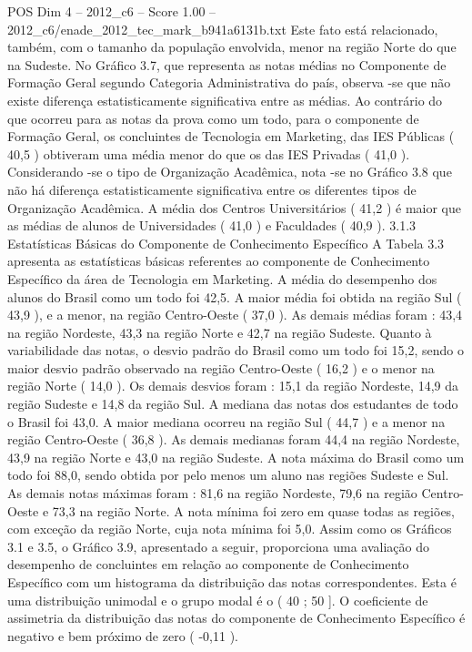 \begin{textsample}{POS Dim 4 – 2012\_c6 – Score 1.00 – 2012\_c6/enade\_2012\_tec\_mark\_b941a6131b.txt}
Este fato está relacionado, também, com o tamanho da população envolvida, menor na região Norte do que na Sudeste.
No Gráfico 3.7, que representa as notas médias no Componente de Formação Geral segundo Categoria Administrativa do país, observa -se que não existe diferença estatisticamente significativa entre as médias.
Ao contrário do que ocorreu para as notas da prova como um todo, para o componente de Formação Geral, os concluintes de Tecnologia em Marketing, das IES Públicas ( 40,5 ) obtiveram uma média menor do que os das IES Privadas ( 41,0 ).
Considerando -se o tipo de Organização Acadêmica, nota -se no Gráfico 3.8 que não há diferença estatisticamente significativa entre os diferentes tipos de Organização Acadêmica.
A média dos Centros Universitários ( 41,2 ) é maior que as médias de alunos de Universidades ( 41,0 ) e Faculdades ( 40,9 ). 3.1.3 Estatísticas Básicas do Componente de Conhecimento Específico A Tabela 3.3 apresenta as estatísticas básicas referentes ao componente de Conhecimento Específico da área de Tecnologia em Marketing.
A média do desempenho dos alunos do Brasil como um todo foi 42,5.
A maior média foi obtida na região Sul ( 43,9 ), e a menor, na região Centro-Oeste ( 37,0 ).
As demais médias foram : 43,4 na região Nordeste, 43,3 na região Norte e 42,7 na região Sudeste.
Quanto à variabilidade das notas, o desvio padrão do Brasil como um todo foi 15,2, sendo o maior desvio padrão observado na região Centro-Oeste ( 16,2 ) e o menor na região Norte ( 14,0 ).
Os demais desvios foram : 15,1 da região Nordeste, 14,9 da região Sudeste e 14,8 da região Sul.
A mediana das notas dos estudantes de todo o Brasil foi 43,0.
A maior mediana ocorreu na região Sul ( 44,7 ) e a menor na região Centro-Oeste ( 36,8 ).
As demais medianas foram 44,4 na região Nordeste, 43,9 na região Norte e 43,0 na região Sudeste.
A nota máxima do Brasil como um todo foi 88,0, sendo obtida por pelo menos um aluno nas regiões Sudeste e Sul.
As demais notas máximas foram : 81,6 na região Nordeste, 79,6 na região Centro-Oeste e 73,3 na região Norte.
A nota mínima foi zero em quase todas as regiões, com exceção da região Norte, cuja nota mínima foi 5,0.
Assim como os Gráficos 3.1 e 3.5, o Gráfico 3.9, apresentado a seguir, proporciona uma avaliação do desempenho de concluintes em relação ao componente de Conhecimento Específico com um histograma da distribuição das notas correspondentes.
Esta é uma distribuição unimodal e o grupo modal é o ( 40 ; 50 ].
O coeficiente de assimetria da distribuição das notas do componente de Conhecimento Específico é negativo e bem próximo de zero ( -0,11 ).

\end{textsample}
